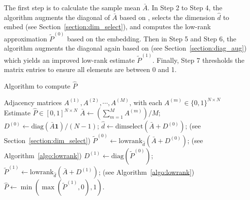 \documentclass[journal,twoside,web]{ieeecolor}
\begin{document}
The first step is to calculate the sample mean $\bar{A}$.
In Step 2 to Step 4, the algorithm augments the diagonal of $\bar{A}$ based on \cite{marchette2011vertex}, selects the dimension $\hat{d}$ to embed (see Section~\ref{section:dim_select}), and computes the low-rank approximation $\tilde{P}^{(0)}$ based on the embedding. 
Then in Step 5 and Step 6, the algorithm augments the diagonal again based on \cite{scheinerman2010modeling} (see Section~\ref{section:diag_aug}) which yields an improved low-rank estimate $\tilde{P}^{(1)}$.
Finally, Step 7 thresholds the matrix entries to ensure all elements are between 0 and 1.

\begin{algorithm}
\caption{Algorithm to compute $\hat{P}$}
\label{algo:basic}
\begin{algorithmic}[1]
\REQUIRE Adjacency matrices $A^{(1)}, A^{(2)}, \cdots, A^{(M)}$, with each $A^{(m)} \in \{0,1\}^{N \times N}$
\ENSURE Estimate $\hat{P}\in[0,1]^{N\times N}$
\STATE $\bar{A} \leftarrow \left(\sum\limits_{m = 1}^M A^{(m)}\right)/M$;
\STATE $D^{(0)} \leftarrow \mathrm{diag}(\bar{A} \bm{1})/(N-1)$;
\STATE $\hat{d} \leftarrow \mathrm{dimselect}(\bar{A} + D^{(0)})$; (see Section~\ref{section:dim_select})
\STATE $\tilde{P}^{(0)} \leftarrow \mathrm{lowrank}_{\hat{d}}(\bar{A} + D^{(0)})$; (see Algorithm~\ref{algo:lowrank})
\STATE $D^{(1)} \leftarrow \mathrm{diag}(\tilde{P}^{(0)})$;
\STATE $\tilde{P}^{(1)} \leftarrow \mathrm{lowrank}_{\hat{d}}(\bar{A} + D^{(1)})$; (see Algorithm~\ref{algo:lowrank})
\STATE $\hat{P} \leftarrow \min(\max(\tilde{P}^{(1)}, 0), 1)$.
\end{algorithmic}
\end{algorithm}

\end{document}
